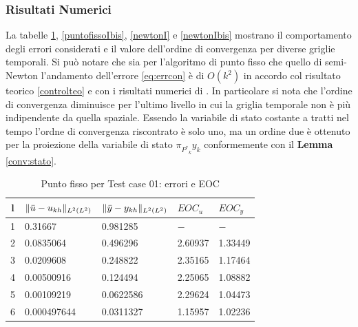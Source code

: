 \subsubsection{Risultati Numerici}
La tabelle \ref{puntofissoI}, \ref{puntofissoIbis}, \ref{newtonI} e \ref{newtonIbis} mostrano il comportamento degli errori considerati e il valore dell'ordine di convergenza per diverse griglie temporali. Si può notare che sia per l'algoritmo di punto fisso che quello di semi-Newton l'andamento dell'errore \ref{eq:errcon} è di $O(k^2)$ in accordo col risultato teorico \ref{controlteo} e con i risultati numerici di \cite{MAIN}. In particolare si nota che l'ordine di convergenza diminuisce per l'ultimo livello in cui la griglia temporale non è più indipendente da quella spaziale. Essendo la variabile di stato costante a tratti nel tempo l'ordne di convergenza riscontrato è solo uno, ma un ordine due è ottenuto per la proiezione della variabile di stato $\pi_{{P^*}_k}y_k$ conformemente con il \textbf{Lemma} \ref{conv:stato}.

\begin{table}
\caption{Punto fisso per Test case 01: errori e EOC }
\label{puntofissoI}
\centering

\begin{tabular}{cllll}
\toprule
{l}           &  {$ \lVert\bar{u}-u_{kh}\rVert_{L^2(L^2)} $} &  {$ \lVert\bar{y}-y_{kh}\rVert_{L^2(L^2)} $} &  {$ EOC_u $} &  {$ EOC_y $} \\
\midrule
1            &  0.31667 &  0.981285 &  {$-$} &  {$-$} \\
2            &  0.0835064 &  0.496296 &  2.60937 &  1.33449 \\
3            &  0.0209608 &  0.248822 &  2.35165 &  1.17464 \\
4            &  0.00500916 &  0.124494 &  2.25065 &  1.08882 \\
5            &  0.00109219  &  0.0622586 &  2.29624 &  1.04473 \\
6            &  0.000497644 &  0.0311327 &  1.15957 &  1.02236 \\
\bottomrule
\end{tabular}              

\end{table}


